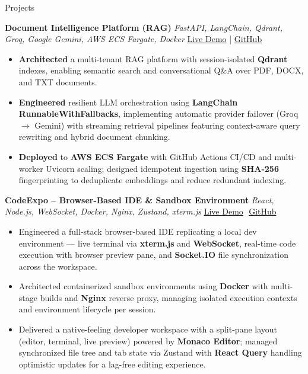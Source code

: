 \documentclass{resume}
\begin{document}
\begin{rSection}{Projects}

\scriptsize \textbf{Document Intelligence Platform (RAG)}
{\scriptsize \textit{FastAPI, LangChain, Qdrant, Groq, Google Gemini, AWS ECS Fargate, Docker}}
\hfill
\href{https://aidoc.harshsaw.ca/}{Live Demo} |
\href{https://github.com/Harshksaw/document_portal}{GitHub}

\begin{itemize}\itemsep -4pt
  \item \textbf{Architected} a multi-tenant RAG platform with session-isolated \textbf{Qdrant} indexes, enabling semantic search and conversational Q\&A over PDF, DOCX, and TXT documents.
  \item \textbf{Engineered} resilient LLM orchestration using \textbf{LangChain RunnableWithFallbacks}, implementing automatic provider failover (Groq $\rightarrow$ Gemini) with streaming retrieval pipelines featuring context-aware query rewriting and hybrid document chunking.
  \item \textbf{Deployed} to \textbf{AWS ECS Fargate} with GitHub Actions CI/CD and multi-worker Uvicorn scaling; designed idempotent ingestion using \textbf{SHA-256} fingerprinting to deduplicate embeddings and reduce redundant indexing.
\end{itemize}

\scriptsize \textbf{CodeExpo -- Browser-Based IDE \& Sandbox Environment}
{\scriptsize \textit{React, Node.js, WebSocket, Docker, Nginx, Zustand, xterm.js}}
\hfill
\href{https://code.harshsaw.ca}{Live Demo}\,\textbullet\,
\href{https://github.com/Harshksaw/Project-IDX-Codesandbox}{GitHub}
\begin{itemize}\itemsep -4pt
    \item Engineered a full-stack browser-based IDE replicating a local dev environment --- live terminal via \textbf{xterm.js} and \textbf{WebSocket}, real-time code execution with browser preview pane, and \textbf{Socket.IO} file synchronization across the workspace.
    \item Architected containerized sandbox environments using \textbf{Docker} with multi-stage builds and \textbf{Nginx} reverse proxy, managing isolated execution contexts and environment lifecycle per session.
    \item Delivered a native-feeling developer workspace with a split-pane layout (editor, terminal, live preview) powered by \textbf{Monaco Editor}; managed synchronized file tree and tab state via Zustand with \textbf{React Query} handling optimistic updates for a lag-free editing experience.
\end{itemize}

\end{rSection}\vspace{-0.7em}
\end{document}
